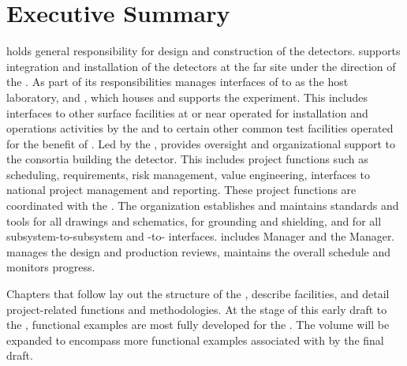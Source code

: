 \chapter{Executive Summary}
\label{vl:tc-execsum}


  holds general responsibility for design and
construction of the  detectors.  supports
integration and installation of the detectors at the far site under
the direction of the .  As part of its responsibilities
 manages interfaces of  to  as the host
laboratory,  and , which houses and supports
the  experiment. This includes interfaces to other surface
facilities at or near  operated for installation and
operations activities by the  and to certain other common test
facilities operated for the benefit of . Led by the
 ,   provides
oversight and organizational support to the consortia building the
 detector.  This includes project functions such as
scheduling, requirements, risk management, value engineering,
interfaces to national project management and reporting. These project
functions are coordinated with the .  The 
organization establishes and maintains standards and tools for all
drawings and schematics, for grounding and shielding, and for all 
subsystem-to-subsystem and -to- interfaces.
 includes   Manager
and the   Manager. 
 manages the design and production 
reviews, maintains the overall schedule and monitors progress.

Chapters that follow lay out the structure of the  ,
describe  facilities, and detail project-related functions
and methodologies. At the stage of this early draft to the  ,
  functional examples are most fully developed
for the  . The volume will be expanded to
encompass more functional examples associated with 
 by the final draft.

